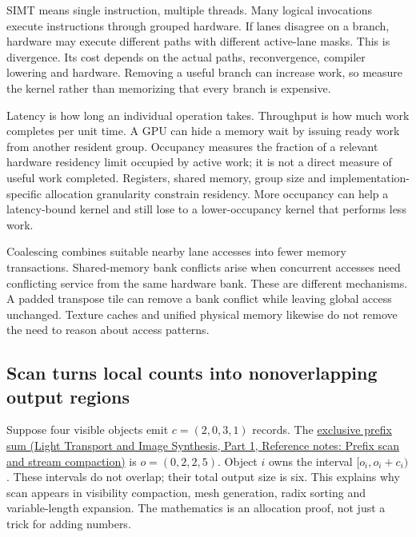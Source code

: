 SIMT means single instruction, multiple threads. Many logical invocations execute instructions through grouped hardware. If lanes disagree on a branch, hardware may execute different paths with different active-lane masks. This is divergence. Its cost depends on the actual paths, reconvergence, compiler lowering and hardware. Removing a useful branch can increase work, so measure the kernel rather than memorizing that every branch is expensive.

Latency is how long an individual operation takes. Throughput is how much work completes per unit time. A GPU can hide a memory wait by issuing ready work from another resident group. Occupancy measures the fraction of a relevant hardware residency limit occupied by active work; it is not a direct measure of useful work completed. Registers, shared memory, group size and implementation-specific allocation granularity constrain residency. More occupancy can help a latency-bound kernel and still lose to a lower-occupancy kernel that performs less work.

Coalescing combines suitable nearby lane accesses into fewer memory transactions. Shared-memory bank conflicts arise when concurrent accesses need conflicting service from the same hardware bank. These are different mechanisms. A padded transpose tile can remove a bank conflict while leaving global access unchanged. Texture caches and unified physical memory likewise do not remove the need to reason about access patterns.

\subsection{Scan turns local counts into nonoverlapping output regions}\label{01-foundations-i-ch008-scan-turns-local-counts-into-nonoverlapping-output-regions}

\hypertarget{01-foundations-i-ch008-scan-turns-local-counts-into-nonoverlapping-output-regions}{}

Suppose four visible objects emit \(c=(2,0,3,1)\) records. The \href{../04-Light-Transport-and-Image-Synthesis-P01/main.pdf\#nameddest=appendix-f2ee4d086415}{exclusive prefix sum (Light Transport and Image Synthesis, Part 1, Reference notes: Prefix scan and stream compaction)} is \(o=(0,2,2,5)\). Object \(i\) owns the interval \([o_i,o_i+c_i)\). These intervals do not overlap; their total output size is six. This explains why scan appears in visibility compaction, mesh generation, radix sorting and variable-length expansion. The mathematics is an allocation proof, not just a trick for adding numbers.

